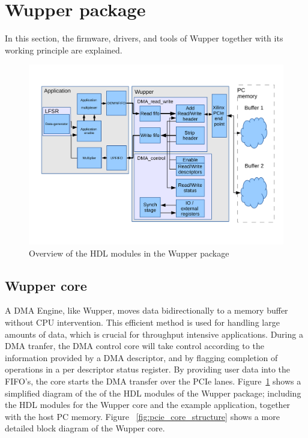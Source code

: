 \section{Wupper package}

In this section, the firmware, drivers, and tools of Wupper together with its working principle are explained. 

\begin{figure}[H]
	\centering
	\includegraphics[width = 0.8 \textwidth]{figures/full_application_structure.pdf}	
	\caption{Overview of the HDL modules in the Wupper package}
	\label{fig:wupperpackage}
\end{figure}


\subsection {Wupper core}
A DMA Engine, like Wupper, moves data bidirectionally to a memory buffer without CPU intervention. This efficient method is used for handling large amounts of data, which is crucial for throughput intensive applications. During a DMA tranfer, the DMA control core will take control according to the information provided by a DMA descriptor, and by flagging completion of operations in a per descriptor status register. By providing user data into the FIFO's, the core starts the DMA transfer over the PCIe lanes. Figure~\ref{fig:wupperpackage} shows a simplified diagram of the of the HDL modules of the Wupper package; including the HDL modules for the Wupper core and the example application, together with the host PC memory. Figure ~\ref{fig:pcie_core_structure} shows a more detailed block diagram of the Wupper core.
\newpage

